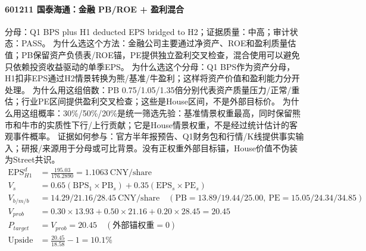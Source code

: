 \paragraph{601211 国泰海通：金融 PB/ROE + 盈利混合}
分母：Q1 BPS plus H1 deducted EPS bridged to H2；证据质量：中高；审计状态：PASS。
为什么选这个方法：金融公司主要通过净资产、ROE和盈利质量估值；PB保留资产负债表/ROE锚，PE提供独立盈利交叉检查，混合使用可以避免只依赖投资收益驱动的单季EPS。
为什么选这个分母：Q1 BPS作为资产分母，H1扣非EPS通过H2情景转换为熊/基准/牛盈利；这样将资产价值和盈利能力分开处理。
为什么用这组倍数：PB 0.75/1.05/1.35倍分别代表资产质量压力/正常/重估；行业PE区间提供盈利交叉检查；这些是House区间，不是外部目标价。
为什么用这组概率：30\%/50\%/20\%是统一筛选先验：基准情景权重最高，同时保留熊市和牛市的实质性下行/上行贡献；它是House情景权重，不是经过统计估计的客观事件概率。
证据如何参与：官方半年报预告、Q1财务包和行情/K线提供事实输入；研报/来源用于分母或可比背景。没有正权重外部目标锚，House价值不伪装为Street共识。
\begin{align*}
\mathrm{EPS}_{H1}^d &= \frac{195.03}{176.2890} = 1.1063\ \mathrm{CNY/share}\\
V_s &= 0.65\left(\mathrm{BPS}_1\times \mathrm{PB}_s\right)+0.35\left(\mathrm{EPS}_s\times \mathrm{PE}_s\right)\\
V_{b/m/b} &= 14.29/21.16/28.45\ \mathrm{CNY/share}\quad(\mathrm{PB}=13.89/19.44/25.00,\ \mathrm{PE}=15.05/24.34/34.85)\\
V_{prob} &= 0.30\times 13.93+0.50\times 21.16+0.20\times 28.45=20.45\\
P_{target} &= V_{prob}=20.45\quad(\text{外部锚权重}=0)\\
\mathrm{Upside} &= \frac{20.45}{18.58}-1=10.1\%\\
\end{align*}

